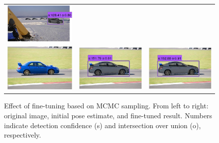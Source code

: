 \documentclass[10pt,twocolumn,letterpaper]{article}
\begin{document}
\begin{figure}[h]
\begin{tabular}{ccc}
  \includegraphics[width=0.22\linewidth]{supp/tuning_5c.png}  \\
  \includegraphics[width=0.22\linewidth]{supp/tuning_6a.png} &
  \includegraphics[width=0.22\linewidth]{supp/tuning_6b.png} & 
  \includegraphics[width=0.22\linewidth]{supp/tuning_6c.png}  \\
  \end{tabular}
\caption{Effect of fine-tuning based on MCMC sampling. From left to
  right: original image, initial pose estimate, and fine-tuned
  result. Numbers indicate detection confidence (s) and intersection
  over union (o), respectively.} 
  \label{fig:tuning}
\end{figure}


{\small


}
\end{document}
